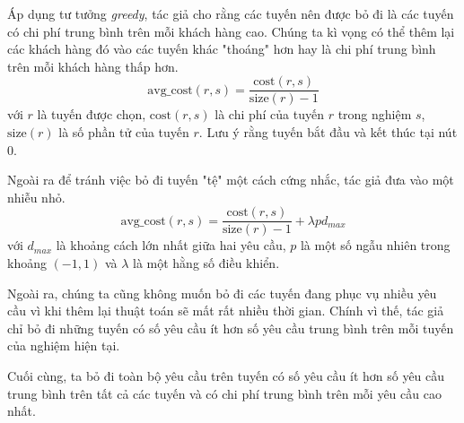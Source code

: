 Áp dụng tư tưởng \textit{greedy}, tác giả cho rằng các tuyến nên được bỏ đi là các tuyến có chi phí trung bình trên mỗi khách hàng cao. Chúng ta kì vọng có thể thêm lại các khách hàng đó vào các tuyến khác "thoáng" hơn hay là chi phí trung bình trên mỗi khách hàng thấp hơn.
\begin{equation}
	\label{eq:destroy_route}
	\text{avg\_cost}(r, s) = \frac{\text{cost}(r, s)}{\text{size}(r)-1}
\end{equation}
với $r$ là tuyến được chọn, $\text{cost}(r,s)$ là chi phí của tuyến $r$ trong nghiệm $s$, $\text{size}(r)$ là số phần tử của tuyến $r$. Lưu ý rằng tuyến bắt đầu và kết thúc tại nút $0$.

Ngoài ra để tránh việc bỏ đi tuyến "tệ" một cách cứng nhắc, tác giả đưa vào một nhiễu nhỏ.\begin{equation}
	\label{eq:destroy_route}
	\text{avg\_cost}(r, s) = \frac{\text{cost}(r, s)}{\text{size}(r)-1} + \lambda p d_{max}
\end{equation}
với $d_{max}$ là khoảng cách lớn nhất giữa hai yêu cầu, $p$ là một số ngẫu nhiên trong khoảng $(-1,1)$ và $\lambda$ là một hằng số điều khiển.

Ngoài ra, chúng ta cũng không muốn bỏ đi các tuyến đang phục vụ nhiều yêu cầu vì khi thêm lại thuật toán sẽ mất rất nhiều thời gian. Chính vì thế, tác giả chỉ bỏ đi những tuyến có số yêu cầu ít hơn số yêu cầu trung bình trên mỗi tuyến của nghiệm hiện tại.

Cuối cùng, ta bỏ đi toàn bộ yêu cầu trên tuyến có số yêu cầu ít hơn số yêu cầu trung bình trên tất cả các tuyến và có chi phí trung bình trên mỗi yêu cầu cao nhất.